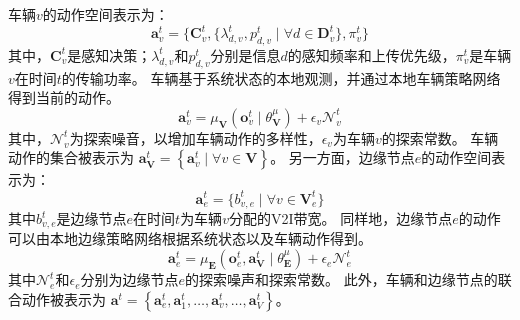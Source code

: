 车辆$v$的动作空间表示为：
\begin{equation}
	\boldsymbol{a}_{v}^{t} = \{ \mathbf{C}_v^t,  \{ \lambda_{d, v}^{t}, p_{d, v}^{t} \mid \forall d \in \mathbf{D}_{v}^t \} , \pi_v^t   \}
\end{equation}
其中，$\mathbf{C}_v^t$是感知决策；$\lambda_{d, v}^{t}$和$p_{d, v}^{t}$分别是信息$d$的感知频率和上传优先级，$\pi_v^t$是车辆$v$在时间$t$的传输功率。
车辆基于系统状态的本地观测，并通过本地车辆策略网络得到当前的动作。
\begin{equation}
	\boldsymbol{a}_{v}^{t}=\mu_{\mathbf{V}}\left(\boldsymbol{o}_{v}^{t} \mid \theta_{\mathbf{V}}^{\mu}\right)+\epsilon_{v} \mathcal{N}_{v}^{t}
\end{equation}
\noindent 其中，$\mathcal{N}_{v}^{t}$为探索噪音，以增加车辆动作的多样性，$\epsilon_{v}$为车辆$v$的探索常数。
车辆动作的集合被表示为 $\boldsymbol{a}_{\mathbf{V}}^{t} = \left\{\boldsymbol{a}_{v}^{t}\mid \forall v \in \mathbf{V}\right\}$。
另一方面，边缘节点$e$的动作空间表示为：
\begin{equation}
	\boldsymbol{a}_{e}^{t} = \{b_{v, e}^{t} \mid \forall v \in \mathbf{V}_{e}^{t}\}
\end{equation}
其中$b_{v, e}^t$是边缘节点$e$在时间$t$为车辆$v$分配的V2I带宽。
同样地，边缘节点$e$的动作可以由本地边缘策略网络根据系统状态以及车辆动作得到。
\begin{equation}
	\boldsymbol{a}_{e}^{t}=\mu_{\mathbf{E}}\left(\boldsymbol{o}_{e}^{t},  \boldsymbol{a}_{\boldsymbol{\mathbf{V}}}^{t} \mid \theta_{\mathbf{E}}^{\mu}\right)+\epsilon_{e} \mathcal{N}_{e}^{t}
\end{equation}
\noindent 其中$\mathcal{N}_{e}^{t}$和$\epsilon_{e}$分别为边缘节点$e$的探索噪声和探索常数。
此外，车辆和边缘节点的联合动作被表示为 $\boldsymbol{a}^{t}= \left\{\boldsymbol{a}_{e}^{t}, \boldsymbol{a}_{1}^{t}, \ldots, \boldsymbol{a}_{v}^{t}, \ldots, \boldsymbol{a}_{V}^{t}\right\}$。

